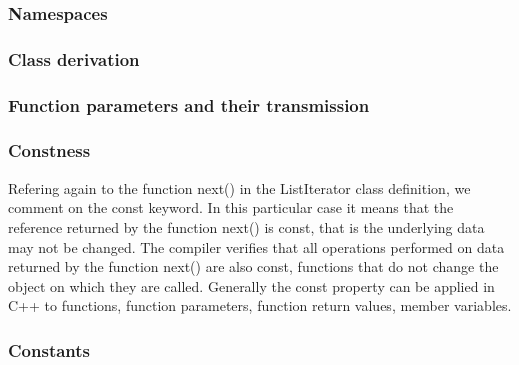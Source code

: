 \subsubsection {Namespaces}
\subsubsection {Class derivation}
\subsubsection {Function parameters and their transmission}
\subsubsection {Constness}

Refering again to the function next() in the ListIterator class definition, we comment on the const keyword. In this particular case it means that the reference returned by the function next() is const, that is the underlying data may not be changed. The compiler verifies that all operations performed on data returned by the function next() are also const, functions that do not change the object on which they are called. Generally the const property can be applied in C++ to functions, function parameters, function return values, member variables. 
\subsubsection {Constants}